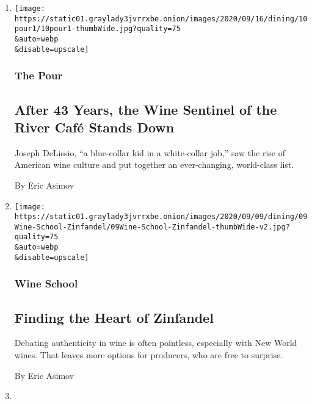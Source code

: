 \begin{enumerate}
\def\labelenumi{\arabic{enumi}.}
\item
  \href{/2020/09/10/dining/drinks/river-cafe-wine-joseph-delissio.html}{}

  \texttt{[image: https://static01.graylady3jvrrxbe.onion/images/2020/09/16/dining/10pour1/10pour1-thumbWide.jpg?quality=75\\\&auto=webp\\\&disable=upscale]}

  \hypertarget{the-pour}{%
  \subsubsection{The Pour}\label{the-pour}}

  \hypertarget{after-43-years-the-wine-sentinel-of-the-river-cafuxe9-stands-down}{%
  \subsection{After 43 Years, the Wine Sentinel of the River Café Stands
  Down}\label{after-43-years-the-wine-sentinel-of-the-river-cafuxe9-stands-down}}

  Joseph DeLissio, ``a blue-collar kid in a white-collar job,'' saw the
  rise of American wine culture and put together an ever-changing,
  world-class list.

  By Eric Asimov
\item
  \href{/2020/09/03/dining/drinks/wine-school-zinfandel.html}{}

  \texttt{[image: https://static01.graylady3jvrrxbe.onion/images/2020/09/09/dining/09Wine-School-Zinfandel/09Wine-School-Zinfandel-thumbWide-v2.jpg?quality=75\\\&auto=webp\\\&disable=upscale]}

  \hypertarget{wine-school}{%
  \subsubsection{Wine School}\label{wine-school}}

  \hypertarget{finding-the-heart-of-zinfandel}{%
  \subsection{Finding the Heart of
  Zinfandel}\label{finding-the-heart-of-zinfandel}}

  Debating authenticity in wine is often pointless, especially with New
  World wines. That leaves more options for producers, who are free to
  surprise.

  By Eric Asimov
\item
  \href{/2020/09/03/dining/drinks/wine-school-assignment-northern-rhone-reds.html}{}


\end{enumerate}

